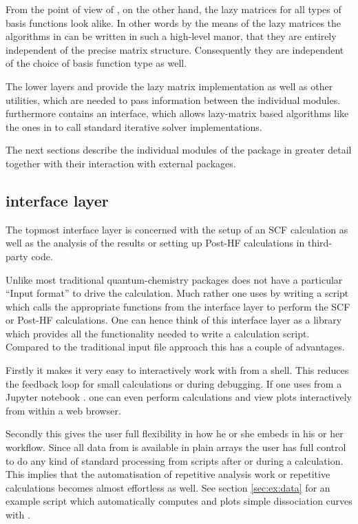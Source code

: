 From the point of view of \gscf,
on the other hand,
the lazy matrices for all types of basis functions look alike.
In other words by the means of the lazy matrices
the algorithms in \gscf
can be written in such a high-level manor,
that they are entirely independent of the precise matrix structure.
Consequently they are independent of the choice of basis function type as well.

The lower layers \lazyten and \krims provide
the lazy matrix implementation as well as other utilities,
which are needed to pass information between the individual modules.
\lazyten furthermore contains an interface,
which allows lazy-matrix based algorithms like the ones in \gscf to
call standard iterative solver implementations.

The next sections describe the individual modules of the \molsturm
package in greater detail together with their interaction
with external packages.

%
%
\subsection{\molsturm interface layer}

The topmost \molsturm interface layer is concerned with the setup of an
SCF calculation as well as the analysis of the results or setting
up Post-HF calculations in third-party code.

Unlike most traditional quantum-chemistry packages \molsturm does not have
a particular ``Input format'' to drive the calculation.
Much rather one uses \molsturm by writing a \python
script which calls the appropriate functions from the interface
layer to perform the SCF or Post-HF calculations.
One can hence think of this interface layer as a library
which provides all the functionality needed to write
a calculation \python script.
Compared to the traditional input file approach this has
a couple of advantages.

Firstly it makes it very easy to interactively work with \molsturm
from a shell.
This reduces the feedback loop for small calculations
or during debugging.
If one uses \molsturm from a Jupyter notebook
.
one can even perform calculations and view plots
interactively from within a web browser.

Secondly this gives the user full flexibility
in how he or she embeds \molsturm in his or her workflow.
Since all data from \molsturm is available
in plain \numpy arrays the user has full control to do
any kind of standard processing from \python scripts
after or during a calculation.
This implies that the automatisation of repetitive
analysis work or repetitive calculations
becomes almost effortless as well.
See section \ref{sec:ex:data} for an example
\python script which automatically computes and plots
simple dissociation curves with \molsturm.

